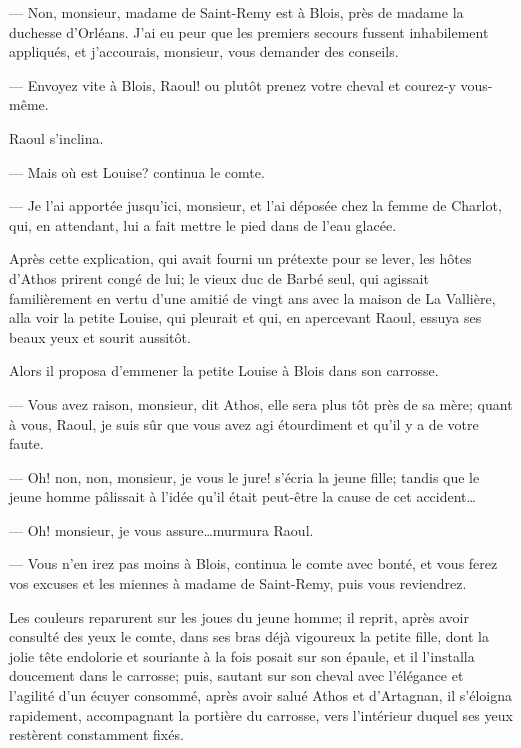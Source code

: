 — Non, monsieur, madame de Saint-Remy est à Blois, près de madame la duchesse d'Orléans. J'ai eu peur que les premiers secours fussent inhabilement appliqués, et j'accourais, monsieur, vous demander des conseils.

— Envoyez vite à Blois, Raoul! ou plutôt prenez votre cheval et courez-y vous-même.

Raoul s'inclina.

— Mais où est Louise? continua le comte.

— Je l'ai apportée jusqu'ici, monsieur, et l'ai déposée chez la femme de Charlot, qui, en attendant, lui a fait mettre le pied dans de l'eau glacée.

Après cette explication, qui avait fourni un prétexte pour se lever, les hôtes d'Athos prirent congé de lui; le vieux duc de Barbé seul, qui agissait familièrement en vertu d'une amitié de vingt ans avec la maison de La Vallière, alla voir la petite Louise, qui pleurait et qui, en apercevant Raoul, essuya ses beaux yeux et sourit aussitôt.

Alors il proposa d'emmener la petite Louise à Blois dans son carrosse.

— Vous avez raison, monsieur, dit Athos, elle sera plus tôt près de sa mère; quant à vous, Raoul, je suis sûr que vous avez agi étourdiment et qu'il y a de votre faute.

— Oh! non, non, monsieur, je vous le jure! s'écria la jeune fille; tandis que le jeune homme pâlissait à l'idée qu'il était peut-être la cause de cet accident\dots

— Oh! monsieur, je vous assure\dots murmura Raoul.

— Vous n'en irez pas moins à Blois, continua le comte avec bonté, et vous ferez vos excuses et les miennes à madame de Saint-Remy, puis vous reviendrez.

Les couleurs reparurent sur les joues du jeune homme; il reprit, après avoir consulté des yeux le comte, dans ses bras déjà vigoureux la petite fille, dont la jolie tête endolorie et souriante à la fois posait sur son épaule, et il l'installa doucement dans le carrosse; puis, sautant sur son cheval avec l'élégance et l'agilité d'un écuyer consommé, après avoir salué Athos et d'Artagnan, il s'éloigna rapidement, accompagnant la portière du carrosse, vers l'intérieur duquel ses yeux restèrent constamment fixés.